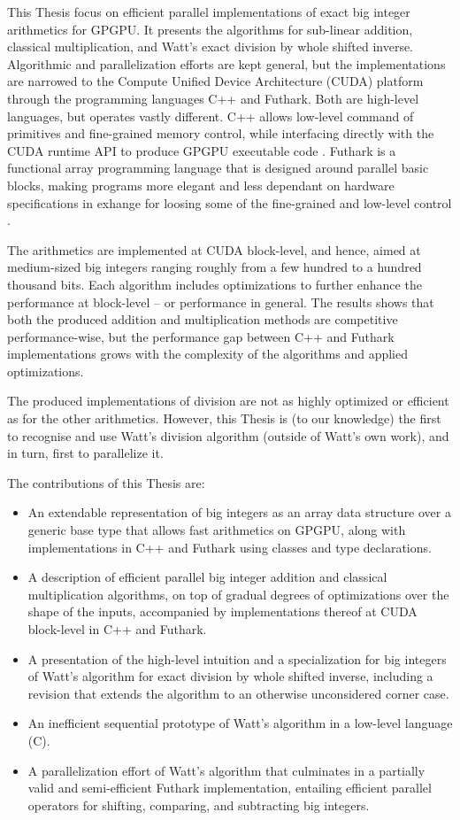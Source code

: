 This Thesis focus on efficient parallel implementations of exact big integer
arithmetics for GPGPU. It presents the algorithms for sub-linear addition,
classical multiplication, and Watt's exact division by whole shifted
inverse. Algorithmic and parallelization efforts are kept general, but the
implementations are narrowed to the Compute Unified Device Architecture (CUDA)
platform through the programming languages C++ and Futhark. Both are high-level
languages, but operates vastly different. C++ allows low-level command of
primitives and fine-grained memory control, while interfacing directly with the
CUDA runtime API to produce GPGPU executable code \cite{cudaguide,
  stroustrup}. Futhark is a functional array programming language that is
designed around parallel basic blocks, making programs more elegant and less
dependant on hardware specifications in exhange for loosing some of the
fine-grained and low-level control \cite{ParallelProgrammingInFuthark,
  Henriksen:2017:FPF:3062341.3062354}.

The arithmetics are implemented at CUDA block-level, and hence, aimed at
medium-sized big integers ranging roughly from a few hundred to a hundred
thousand bits. Each algorithm includes optimizations to further enhance the
performance at block-level -- or performance in general. The results shows that
both the produced addition and multiplication methods are competitive
performance-wise, but the performance gap between C++ and Futhark implementations
grows with the complexity of the algorithms and applied optimizations.

The produced implementations of division are not as highly optimized or
efficient as for the other arithmetics. However, this Thesis is (to our
knowledge) the first to recognise and use Watt's division algorithm (outside of
Watt's own work), and in turn, first to parallelize it.

The contributions of this Thesis are:
\begin{itemize}
\item An extendable representation of big integers as an array data structure
  over a generic base type that allows fast arithmetics on GPGPU, along with
  implementations in C++ and Futhark using classes and type declarations.
\item A description of efficient parallel big integer addition and classical
  multiplication algorithms, on top of gradual degrees of optimizations over the
  shape of the inputs, accompanied by implementations thereof at CUDA
  block-level in C++ and Futhark.
\item A presentation of the high-level intuition and a specialization for big
  integers of Watt's algorithm for exact division by whole shifted inverse,
  including a revision that extends the algorithm to an otherwise unconsidered
  corner case.
\item An inefficient sequential prototype of Watt's algorithm in a low-level
  language (C).
\item A parallelization effort of Watt's algorithm that culminates in a
  partially valid and semi-efficient Futhark implementation, entailing efficient
  parallel operators for shifting, comparing, and subtracting big integers.
\end{itemize}
\bigskip

